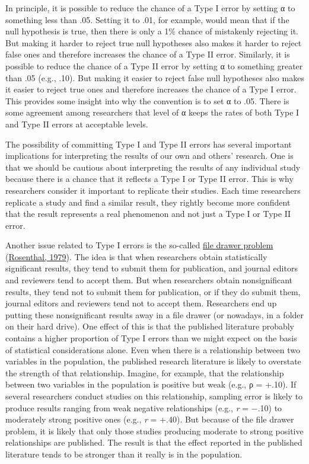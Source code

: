 \documentclass[
]{krantz}
\begin{document}
In principle, it is possible to reduce the chance of a Type I error by setting α to something less than .05. Setting it to .01, for example, would mean that if the null hypothesis is true, then there is only a 1\% chance of mistakenly rejecting it. But making it harder to reject true null hypotheses also makes it harder to reject false ones and therefore increases the chance of a Type II error. Similarly, it is possible to reduce the chance of a Type II error by setting α to something greater than .05 (e.g., .10). But making it easier to reject false null hypotheses also makes it easier to reject true ones and therefore increases the chance of a Type I error. This provides some insight into why the convention is to set α to .05. There is some agreement among researchers that level of α keeps the rates of both Type I and Type II errors at acceptable levels.

The possibility of committing Type I and Type II errors has several important implications for interpreting the results of our own and others' research. One is that we should be cautious about interpreting the results of any individual study because there is a chance that it reflects a Type I or Type II error. This is why researchers consider it important to replicate their studies. Each time researchers replicate a study and find a similar result, they rightly become more confident that the result represents a real phenomenon and not just a Type I or Type II error.

Another issue related to Type I errors is the so-called \protect\hyperlink{file-drawer-problem}{file drawer problem} (\protect\hyperlink{ref-rosenthal1979file}{Rosenthal, 1979}). The idea is that when researchers obtain statistically significant results, they tend to submit them for publication, and journal editors and reviewers tend to accept them. But when researchers obtain nonsignificant results, they tend not to submit them for publication, or if they do submit them, journal editors and reviewers tend not to accept them. Researchers end up putting these nonsignificant results away in a file drawer (or nowadays, in a folder on their hard drive). One effect of this is that the published literature probably contains a higher proportion of Type I errors than we might expect on the basis of statistical considerations alone. Even when there is a relationship between two variables in the population, the published research literature is likely to overstate the strength of that relationship. Imagine, for example, that the relationship between two variables in the population is positive but weak (e.g., ρ = +.10). If several researchers conduct studies on this relationship, sampling error is likely to produce results ranging from weak negative relationships (e.g., \emph{r} = −.10) to moderately strong positive ones (e.g., \emph{r} = +.40). But because of the file drawer problem, it is likely that only those studies producing moderate to strong positive relationships are published. The result is that the effect reported in the published literature tends to be stronger than it really is in the population.
\end{document}
